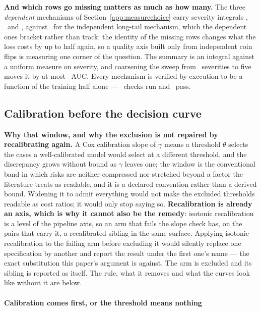 \textbf{And which rows go missing matters as much as how many.} The three
\emph{dependent} mechanisms of Section~\ref{app:measurechoice} carry severity
integrals \integralTime, \integralContent\ and \integralPropensity, against
\integralMaskRare\ for the independent long-tail mechanism, which the
dependent ones bracket rather than track: the identity of the missing rows
changes what the loss costs by up to half again, so a quality axis built only
from independent coin flips is measuring one corner of the question. The
summary is an integral against a uniform measure on severity, and coarsening
the sweep from \nCaseSweepLevels\ severities to five moves it by at most
\gridShiftMaxCase\ AUC. Every mechanism is verified by execution to be a
function of the training half alone --- \nQualityLeakChecked\ checks run and
\nQualityLeakPassed\ pass.

\subsection{Calibration before the decision curve}
\label{app:dcadetail}

\textbf{Why that window, and why the exclusion is not repaired by
recalibrating again.} A Cox calibration slope of $\gamma$ means a threshold
$\theta$ selects the cases a well-calibrated model would select at a different
threshold, and the discrepancy grows without bound as $\gamma$ leaves one; the
window is the conventional band in which risks are neither compressed nor
stretched beyond a factor the literature treats as readable, and it is a
declared convention rather than a derived bound. Widening it to admit everything would not make the excluded thresholds
readable as cost ratios; it would only stop saying so. \textbf{Recalibration
is already an axis, which is why it cannot also be the remedy}: isotonic
recalibration is a level of the pipeline axis, so an arm that fails the slope
check has, on the pairs that carry it, a recalibrated sibling in the same
surface. Applying isotonic recalibration to the failing arm before excluding
it would silently replace one specification by another and report the result
under the first one's name --- the exact substitution this paper's argument is
against. The arm is excluded and its sibling is reported as itself.
The rule, what it removes and what the curves look like without it are
below.


\paragraph{Calibration comes first, or the threshold means nothing}


